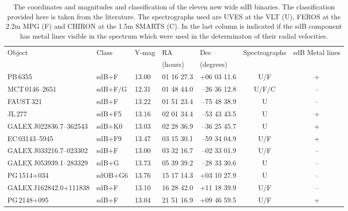 \begin{table}
   \centering
   \caption{The coordinates and magnitudes and classification of the eleven new wide sdB binaries. The classification provided here is taken from the literature. The spectrographs used are UVES at the VLT (U), FEROS at the 2.2m MPG (F) and CHIRON at the 1.5m SMARTS (C). In the last column is indicated if the sdB component has metal lines visible in the spectrum which were used in the determinaton of their radial velocities.} \label{tb:observations}
   \begin{tabular}{llllrcc}
    \hline
    Object   &  Class  &  V-mag   &   RA     &   \multicolumn{1}{l}{Dec}      &  Spectrographs  & sdB Metal lines  \\
             &         &          &  (hours) & \multicolumn{1}{l}{(degrees)}  &                 &                  \\\hline \hline

    PB\,6355                   &  sdB+F    &  13.00  &  01 16 27.3  &   +06 03 11.6  &  U/F     &   +   \\          %
    MCT\,0146--2651            &  sdB+F/G  &  12.31  &  01 48 44.0  &  --26 36 12.8  &  U/F/C   &   --   \\
    FAUST\,321                 &  sdB+F    &  13.22  &  01 51 23.4  &  --75 48 38.9  &  U       &   --   \\          %
    JL\,277                    &  sdB+F5   &  13.16  &  02 01 34.4  &  --53 43 43.5  &  U       &   +   \\          %
    GALEX\,J022836.7--362543   &  sdB+K0   &  13.03  &  02 28 36.9  &  --36 25 45.7  &  U       &   +   \\          %
    EC\,03143--5945            &  sdB+F9   &  13.47  &  03 15 30.1  &  --59 34 04.9  &  U/F     &   +   \\          %
    GALEX\,J033216.7--023302   &  sdB+F    &  13.00  &  03 32 16.7  &  --02 33 01.9  &  U/F     &   --   \\          %
    GALEX\,J053939.1--283329   &  sdB+G    &  13.73  &  05 39 39.2  &  --28 33 30.6  &  U       &   --   \\          %
    PG\,1514+034               &  sdOB+G6  &  13.76  &  15 17 14.3  &   +03 10 27.9  &  U       &   --   \\          %
    GALEX\,J162842.0+111838    &  sdB+F    &  13.10  &  16 28 42.0  &   +11 18 39.9  &  U/F     &   --   \\          %
    PG\,2148+095               &  sdB+F    &  13.04  &  21 51 16.9  &   +09 46 59.5  &  U/F     &   +   \\\hline    %
    
   \end{tabular}
\end{table}